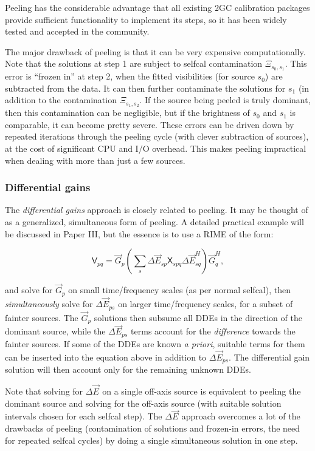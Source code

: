 \documentclass[referee]{aa}
\newcommand{\herm}{H}
\newcommand{\jones}[2]{\vec {#1}_{#2}}
\newcommand{\jonesT}[2]{\vec {#1}^{\herm}_{#2}}
\newcommand{\coh}[2]{\mathsf{{#1}}_{{#2}}}
\begin{document}
Peeling has the considerable advantage that all existing 2GC calibration packages provide sufficient functionality to implement its steps, so it has been widely tested and accepted in the community. 

The major drawback of peeling is that it can be very expensive computationally. Note that the solutions at step 1 are subject to selfcal contamination $\Xi_{s_0,s_1}$. This error is ``frozen in'' at step 2, when the fitted visibilities (for source $s_0$) are subtracted from the data. It can then further contaminate the solutions for $s_1$ (in addition to the contamination $\Xi_{s_1,s_2}$. If the source being peeled is truly dominant, then this contamination can be negligible, but if the brightness of $s_0$ and $s_1$ is comparable, it can become pretty severe. These errors can be driven down by repeated iterations through the peeling cycle (with clever subtraction of sources), at the cost of significant CPU and I/O overhead. This makes peeling impractical when dealing with more than just a few sources. 

\subsubsection{Differential gains\label{sec:dEs}}

The \emph{differential gains} approach is closely related to peeling. It may be thought of as a generalized, simultaneous form of peeling. A detailed practical example will be discussed in Paper III, but the essence is to use a RIME of the form:

\begin{equation}\label{eq:de}
\coh{V}{pq} = \jones{G}{p} \left( \sum_s \Delta\jones{E}{sp} \coh{X}{spq} \Delta\jonesT{E}{sq} \right)  \jonesT{G}{q},
\end{equation}

and solve for $\jones{G}{p}$ on small time/frequency scales (as per normal selfcal), then \emph{simultaneously} solve for $\Delta\jones{E}{ps}$ on larger time/frequency scales, for a subset of fainter sources. The $\jones{G}{p}$ solutions then subsume all DDEs in the direction of the dominant source, while the $\Delta\jones{E}{ps}$ terms account for the \emph{difference} towards the fainter sources. If some of the DDEs are known \emph{a priori}, suitable terms for them can be inserted into the equation above in addition to $\Delta\jones{E}{ps}$. The differential gain solution will then account only for the remaining unknown DDEs.

Note that solving for $\Delta\jones{E}{}$ on a single off-axis source is equivalent to peeling the dominant source and solving for the off-axis source (with suitable solution intervals chosen for each selfcal step). The $\Delta\jones{E}{}$ approach overcomes a lot of the drawbacks of peeling (contamination of solutions and frozen-in errors, the need for repeated selfcal cycles) by doing a single simultaneous solution in one step.
\end{document}
